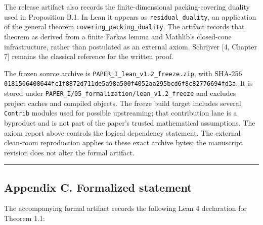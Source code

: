 \documentclass[english,11pt,a4paper]{article}
\begin{document}
The release artifact also records the finite-dimensional
packing-covering duality used in Proposition B.1. In Lean it appears as
\nolinkurl{residual_duality}, an application of the general theorem
\nolinkurl{covering_packing_duality}. The artifact records that theorem
as derived from a finite Farkas lemma and Mathlib's closed-cone
infrastructure, rather than postulated as an external axiom. Schrijver
{[}4, Chapter 7{]} remains the classical reference for the written
proof.

The frozen source archive is \nolinkurl{PAPER_I_lean_v1.2_freeze.zip},
with SHA-256
\nolinkurl{0181506408644fc1f8872d711de5a98a500f4052aa295bcd6f8c82776694fd3a}.
It is stored under
\nolinkurl{PAPER_I/05_formalization/lean_v1.2_freeze} and excludes
project caches and compiled objects. The freeze build target includes
several \nolinkurl{Contrib} modules used for possible upstreaming; that
contribution lane is a byproduct and is not part of the paper's trusted
mathematical assumptions. The axiom report above controls the logical
dependency statement. The external clean-room reproduction applies to
these exact archive bytes; the manuscript revision does not alter the
formal artifact.

\begin{center}\rule{0.5\linewidth}{0.5pt}\end{center}

\subsection{Appendix C. Formalized
statement}\label{appendix-c.-formalized-statement}

The accompanying formal artifact records the following Lean 4
declaration for Theorem 1.1:
\end{document}
